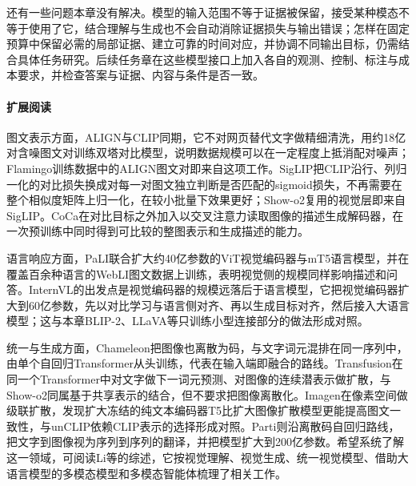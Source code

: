 还有一些问题本章没有解决。模型的输入范围不等于证据被保留，接受某种模态不等于使用了它，结合理解与生成也不会自动消除证据损失与输出错误；怎样在固定预算中保留必需的局部证据、建立可靠的时间对应，并协调不同输出目标，仍需结合具体任务研究。后续任务章在这些模型接口上加入各自的观测、控制、标注与成本要求，并检查答案与证据、内容与条件是否一致。

\paragraph{扩展阅读}
图文表示方面，ALIGN与CLIP同期，它不对网页替代文字做精细清洗，用约18亿对含噪图文对训练双塔对比模型，说明数据规模可以在一定程度上抵消配对噪声；Flamingo训练数据中的ALIGN图文对即来自这项工作。SigLIP把CLIP沿行、列归一化的对比损失换成对每一对图文独立判断是否匹配的sigmoid损失，不再需要在整个相似度矩阵上归一化，在较小批量下效果更好；Show-o2复用的视觉层即来自SigLIP。CoCa在对比目标之外加入以交叉注意力读取图像的描述生成解码器，在一次预训练中同时得到可比较的整图表示和生成描述的能力。

语言响应方面，PaLI联合扩大约40亿参数的ViT视觉编码器与mT5语言模型，并在覆盖百余种语言的WebLI图文数据上训练，表明视觉侧的规模同样影响描述和问答。InternVL的出发点是视觉编码器的规模远落后于语言模型，它把视觉编码器扩大到60亿参数，先以对比学习与语言侧对齐、再以生成目标对齐，然后接入大语言模型；这与本章BLIP-2、LLaVA等只训练小型连接部分的做法形成对照。

统一与生成方面，Chameleon把图像也离散为码，与文字词元混排在同一序列中，由单个自回归Transformer从头训练，代表在输入端即融合的路线。Transfusion在同一个Transformer中对文字做下一词元预测、对图像的连续潜表示做扩散，与Show-o2同属基于共享表示的结合，但不要求把图像离散化。Imagen在像素空间做级联扩散，发现扩大冻结的纯文本编码器T5比扩大图像扩散模型更能提高图文一致性，与unCLIP依赖CLIP表示的选择形成对照。Parti则沿离散码自回归路线，把文字到图像视为序列到序列的翻译，并把模型扩大到200亿参数。希望系统了解这一领域，可阅读Li等的综述，它按视觉理解、视觉生成、统一视觉模型、借助大语言模型的多模态模型和多模态智能体梳理了相关工作。
